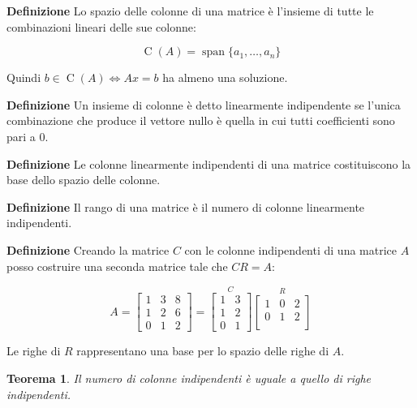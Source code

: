 \documentclass{article}
\newtheorem{theorem}{Teorema}
\newcommand{\df}{\noindent\textbf{Definizione} }
\begin{document}
\vspace{8pt}

\df Lo spazio delle colonne di una matrice è l'insieme di tutte le combinazioni lineari delle sue colonne:

\[
\operatorname{C}(A)=\operatorname{span}\{a_1,\ldots,a_n\}
\]

\vspace{5pt}

Quindi $b\in\operatorname{C}(A) \iff Ax=b$ ha almeno una soluzione.\newline

\df Un insieme di colonne è detto linearmente indipendente se l'unica combinazione che produce il vettore nullo è quella in cui tutti coefficienti sono pari a 0. \newline

\df Le colonne linearmente indipendenti di una matrice costituiscono la base dello spazio delle colonne.\newline

\df Il rango di una matrice è il numero di colonne linearmente indipendenti.\newline

\df Creando la matrice $C$ con le colonne indipendenti di una matrice $A$ posso costruire una seconda matrice tale che $CR=A$:

\[
A=
\begin{bmatrix}
    1 & 3 & 8\\ 
    1 & 2 & 6 \\
    0 & 1 & 2
\end{bmatrix}
=
\overset{C}{
\begin{bmatrix}
    1 & 3\\ 
    1 & 2\\
    0 & 1 
\end{bmatrix}}
\overset{R}{
\begin{bmatrix}
    1 & 0 & 2\\ 
    0 & 1 & 2\\
\end{bmatrix}}
\]

\vspace{6pt}

Le righe di $R$ rappresentano una base per lo spazio delle righe di $A$.

\vspace{5pt}

\begin{theorem}
    Il numero di colonne indipendenti è uguale a quello di righe indipendenti.
\end{theorem}
\end{document}
